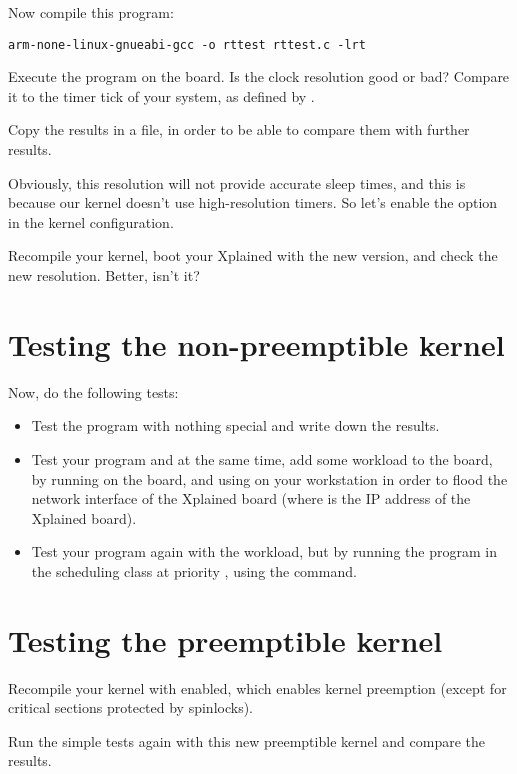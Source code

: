 Now compile this program:
\begin{verbatim}
arm-none-linux-gnueabi-gcc -o rttest rttest.c -lrt
\end{verbatim}

Execute the program on the board. Is the clock resolution good or bad?
Compare it to the timer tick of your system, as defined by
.

Copy the results in a file, in order to be able to compare them
with further results.

Obviously, this resolution will not provide accurate sleep times, and
this is because our kernel doesn't use high-resolution timers. So
let's enable the  option in the kernel
configuration.

Recompile your kernel, boot your Xplained with the new version, and
check the new resolution. Better, isn't it?

\section{Testing the non-preemptible kernel}

Now, do the following tests:
\begin{itemize}
\item Test the program with nothing special and write down the
  results.
\item Test your program and at the same time, add some workload to the
  board, by running  on the
  board, and using  on your
  workstation in order to flood the network interface of the Xplained
  board (where  is the IP address of the Xplained
  board).
\item Test your program again with the workload, but by running the
  program in the  scheduling class at priority
  , using the  command.
\end{itemize}

\section{Testing the preemptible kernel}

Recompile your kernel with  enabled, which
enables kernel preemption (except for critical sections protected by
spinlocks).

Run the simple tests again with this new preemptible kernel and compare
the results.

